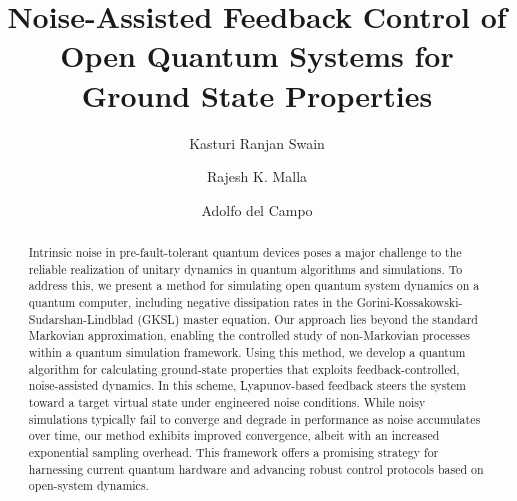 \documentclass[10pt, superscriptaddress,aps,pra,twocolumn,showpacs,nofootinbib, longbibliography, notitlepage,floatfix]{revtex4-2}
\begin{document}
\title{{Noise-Assisted Feedback Control of Open Quantum Systems for Ground State Properties}}

\author{Kasturi Ranjan Swain}
\author{Rajesh K. Malla}
\author{Adolfo del Campo}                 

\begin{abstract}
Intrinsic noise in pre-fault-tolerant quantum devices poses a major challenge to the reliable realization of unitary dynamics in quantum algorithms and simulations. To address this, we present a method for simulating open quantum system dynamics on a quantum computer, including negative dissipation rates in the Gorini-Kossakowski-Sudarshan-Lindblad (GKSL) master equation. Our approach lies beyond the standard Markovian approximation, enabling the controlled study of non-Markovian processes within a quantum simulation framework. Using this method, we develop a quantum algorithm for calculating ground-state properties that exploits feedback-controlled, noise-assisted dynamics. In this scheme, Lyapunov-based feedback steers the system toward a target virtual state under engineered noise conditions. While noisy simulations typically fail to converge and degrade in performance as noise accumulates over time, our method exhibits improved convergence, albeit with an increased exponential sampling overhead. This framework offers a promising strategy for harnessing current quantum hardware and advancing robust control protocols based on open-system dynamics.
\end{abstract}
\maketitle 
\end{document}
